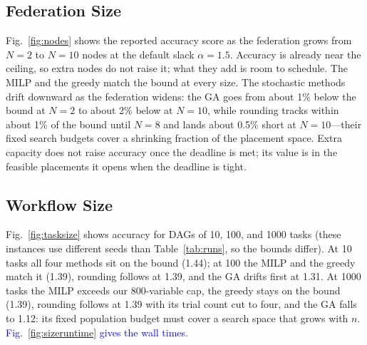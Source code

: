 \documentclass[conference]{IEEEtran}
\newcommand{\rev}[1]{\textcolor{blue}{#1}}%
\begin{document}
\subsection{Federation Size}

Fig.~\ref{fig:nodes} shows the reported accuracy score as the federation grows from $N=2$ to $N=10$ nodes at the default slack $\alpha=1.5$. Accuracy is already near the ceiling, so extra nodes do not raise it; what they add is room to schedule. The MILP and the greedy match the bound at every size. The stochastic methods drift downward as the federation widens: the GA goes from about 1\% below the bound at $N{=}2$ to about 2\% below at $N{=}10$, while rounding tracks within about 1\% of the bound until $N{=}8$ and lands about 0.5\% short at $N{=}10$---their fixed search budgets cover a shrinking fraction of the placement space. Extra capacity does not raise accuracy once the deadline is met; its value is in the feasible placements it opens when the deadline is tight.

\subsection{Workflow Size}
\label{sec:eval-size}

Fig.~\ref{fig:tasksize} shows accuracy for DAGs of 10, 100, and 1000 tasks (these instances use different seeds than Table~\ref{tab:runs}, so the bounds differ). At 10 tasks all four methods sit on the bound (1.44); at 100 the MILP and the greedy match it (1.39), rounding follows at 1.39, and the GA drifts first at 1.31. At 1000 tasks the MILP exceeds our 800-variable cap, the greedy stays on the bound (1.39), rounding follows at 1.39 with its trial count cut to four, and the GA falls to 1.12: its fixed population budget must cover a search space that grows with $n$. \rev{Fig.~\ref{fig:sizeruntime} gives the wall times.}
\end{document}
